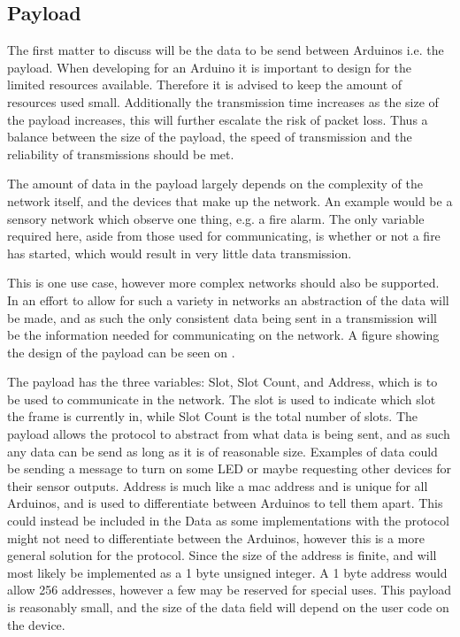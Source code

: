 \subsection{Payload}
The first matter to discuss will be the data to be send between Arduinos i.e. the payload.
When developing for an Arduino it is important to design for the limited resources available.
Therefore it is advised to keep the amount of resources used small.
Additionally the transmission time increases as the size of the payload increases, this will further escalate the risk of packet loss. 
Thus a balance between the size of the payload, the speed of transmission and the reliability of transmissions should be met. 

\bigskip 
The amount of data in the payload largely depends on the complexity of the network itself, and the devices that make up the network.
An example would be a sensory network which observe one thing, e.g. a fire alarm. 
The only variable required here, aside from those used for communicating, is whether or not a fire has started, which would result in very little data transmission.

This is one use case, however more complex networks should also be supported. 
In an effort to allow for such a variety in networks an abstraction of the data will be made, and as such the only consistent data being sent in a transmission will be the information needed for communicating on the network.
A figure showing the design of the payload can be seen on .

\bigskip

The payload has the three variables: Slot, Slot Count, and Address, which is to be used to communicate in the network.
The slot is used to indicate which slot the frame is currently in, while Slot Count is the total number of slots.
The payload allows the protocol to abstract from what data is being sent, and as such any data can be send as long as it is of reasonable size. 
Examples of data could be sending a message to turn on some LED or maybe requesting other devices for their sensor outputs.
Address is much like a mac address and is unique for all Arduinos, and is used to differentiate between Arduinos to tell them apart.
This could instead be included in the Data as some implementations with the protocol might not need to differentiate between the Arduinos, however this is a more general solution for the protocol.
Since the size of the address is finite, and will most likely be implemented as a 1 byte unsigned integer. 
A 1 byte address would allow 256 addresses, however a few may be reserved for special uses.
This payload is reasonably small, and the size of the data field will depend on the user code on the device.
